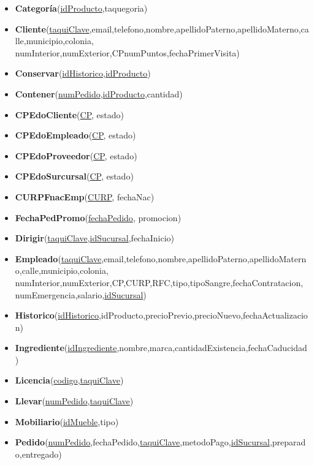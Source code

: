 \documentclass[11pt,letterpaper]{article}
\begin{document}
\begin{itemize}
\item \footnotesize{\textbf{Categoría}(\underline{idProducto},taquegoria)}
\item \footnotesize{\textbf{Cliente}(\underline{taquiClave},email,telefono,nombre,apellidoPaterno,apellidoMaterno,calle,municipio,colonia,
numInterior,numExterior,CPnumPuntos,fechaPrimerVisita)}
\item \footnotesize{\textbf{Conservar}(\underline{idHistorico},\underline{idProducto})}
\item \footnotesize{\textbf{Contener}(\underline{numPedido},\underline{idProducto},cantidad)}
\item {\footnotesize \textbf{CPEdoCliente}(\underline{CP}, estado)}
\item {\footnotesize \textbf{CPEdoEmpleado}(\underline{CP}, estado)} 
\item {\footnotesize \textbf{CPEdoProveedor}(\underline{CP}, estado) }
\item {\footnotesize \textbf{CPEdoSurcursal}(\underline{CP}, estado)}
\item{\footnotesize  \textbf{CURPFnacEmp}(\underline{CURP}, fechaNac) }
\item{\footnotesize  \textbf{FechaPedPromo}(\underline{fechaPedido}, promocion) }
\item \footnotesize{\textbf{Dirigir}(\underline{taquiClave},\underline{idSucursal},fechaInicio)}
\item \footnotesize{\textbf{Empleado}(\underline{taquiClave},email,telefono,nombre,apellidoPaterno,apellidoMaterno,calle,municipio,colonia,
numInterior,numExterior,CP,CURP,RFC,tipo,tipoSangre,fechaContratacion,
numEmergencia,salario,\underline{idSucursal})}
\item \footnotesize{\textbf{Historico}(\underline{idHistorico},idProducto,precioPrevio,precioNuevo,fechaActualizacion)}
\item \footnotesize{\textbf{Ingrediente}(\underline{idIngrediente},nombre,marca,cantidadExistencia,fechaCaducidad)}
\item \footnotesize{\textbf{Licencia}(\underline{codigo},\underline{taquiClave}})
\item \footnotesize{\textbf{Llevar}(\underline{numPedido},\underline{taquiClave})}
\item \footnotesize{\textbf{Mobiliario}(\underline{idMueble},tipo)}
\item \footnotesize{\textbf{Pedido}(\underline{numPedido},fechaPedido,\underline{taquiClave},metodoPago,\underline{idSucursal},preparado,entregado)}

\end{itemize}
\end{document}
